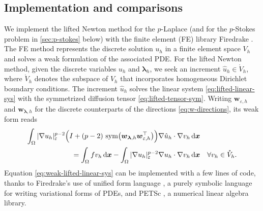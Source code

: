 \documentclass[11pt,pdflatex,sn-mathphys-num]{sn-jnl}
\theoremstyle{thmstyleone}%
\theoremstyle{thmstyletwo}%
\theoremstyle{thmstylethree}%
\newcommand{\bs}[1]{\ensuremath{\boldsymbol{#1}}}
\DeclareMathOperator{\sym}{sym}
\begin{document}
\subsection{Implementation and comparisons}
\label{ssec:plaplace-setup}
We implement the lifted Newton method for the $p$-Laplace (and for the $p$-Stokes problem in \cref{sec:p-stokes} below) with the finite element (FE) library Firedrake \cite{FiredrakeUserManual}. The FE method represents the discrete solution $u_h$ in a finite element space $V_h$ and solves a weak formulation of the associated PDE. For the lifted Newton method, given the discrete variables $u_h$ and $\bs \lambda_h$, we seek an increment $\hat{u}_h\in \mathring{V}_h$, where $\mathring{V}_h$ denotes the subspace of $V_h$ that incorporates homogeneous Dirichlet boundary conditions. The increment $\hat{u}_h$ solves the linear system \eqref{eq:lifted-linear-sys} with the symmetrized diffusion tensor \eqref{eq:lifted-tensor-sym}. Writing $\bs w_{\varepsilon,h}$ and $\bs w_{\bs\lambda,h}$ for the discrete counterparts of the directions \eqref{eq:w-directions}, its weak form reads
\begin{equation}\label{eq:weak-lifted-linear-sys}
    \begin{split}
    \int_\Omega |\nabla u_h|_\varepsilon^{p-2}\Bigl(I + (p-2)\,\sym\bigl(\bs w_{\bs\lambda,h}\bs w_{\varepsilon,h}^\top\bigr)\Bigr)  \nabla \hat u_h \cdot \nabla v_h\,\mathrm{d}\bs x & \\ = \int_\Omega fv_h\,\mathrm{d}\bs x - \int_\Omega |\nabla u_h|_\varepsilon^{p-2}\nabla u_h \cdot \nabla v_h\,\mathrm{d}\bs x &\quad \forall v_h\in\mathring{V}_h.
    \end{split}
\end{equation}
Equation \eqref{eq:weak-lifted-linear-sys} can be implemented with a few lines of code, thanks to Firedrake's use of unified form language \cite{alneas2012}, a purely symbolic language for writing variational forms of PDEs, and PETSc \cite{petsc-user-ref}, a numerical linear algebra library. 
\end{document}
